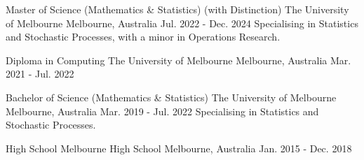 

\begin{cventries}


  \cventry
    {Master of Science (Mathematics \& Statistics) (with Distinction)} %
    {The University of Melbourne} %
    {Melbourne, Australia} %
    {Jul. 2022 - Dec. 2024}
    {Specialising in Statistics and Stochastic Processes, with a minor in Operations Research.}



    

  \cventry
    {Diploma in Computing} %
    {The University of Melbourne} %
    {Melbourne, Australia} %
    {Mar. 2021 -  Jul. 2022} %
    {}

  \cventry
    {Bachelor of Science (Mathematics \& Statistics)} %
    {The University of Melbourne} %
    {Melbourne, Australia} %
    {Mar. 2019 - Jul. 2022} %
    {
     Specialising in Statistics and Stochastic Processes.
    }

  \cventry
    {High School} %
    {Melbourne High School} %
    {Melbourne, Australia} %
    {Jan. 2015 - Dec. 2018} %
    {}


\end{cventries}
